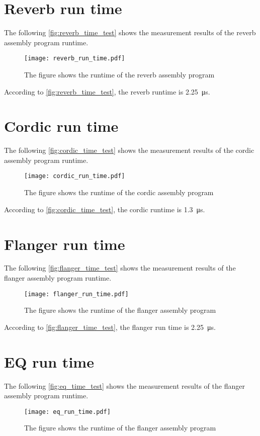 \section*{Reverb run time}
The following \autoref{fig:reverb_time_test} shows the measurement results of the \gls{reverb} assembly program runtime.
\begin{figure}[htbp!]
	\centering
		\texttt{[image: reverb\_run\_time.pdf]}
		\caption{The figure shows the runtime of the \gls{reverb} assembly program}
		\label{fig:reverb_time_test}
\end{figure}

According to \autoref{fig:reverb_time_test}, the \gls{reverb} runtime is \SI{2.25}{\micro\second}.

\section*{Cordic run time}
The following \autoref{fig:cordic_time_test} shows the measurement results of the cordic assembly program runtime.
\begin{figure}[htbp!]
	\centering
		\texttt{[image: cordic\_run\_time.pdf]}
		\caption{The figure shows the runtime of the cordic assembly program}
		\label{fig:cordic_time_test}
\end{figure}

According to \autoref{fig:cordic_time_test}, the cordic runtime is \SI{1.3}{\micro\second}.

\section*{Flanger run time}
The following \autoref{fig:flanger_time_test} shows the measurement results of the flanger assembly program runtime.
\begin{figure}[htbp!]
	\centering
		\texttt{[image: flanger\_run\_time.pdf]}
		\caption{The figure shows the runtime of the flanger assembly program}
		\label{fig:flanger_time_test}
\end{figure}

According to \autoref{fig:flanger_time_test}, the flanger run time is \SI{2.25}{\micro\second}.

\section*{EQ run time}
The following \autoref{fig:eq_time_test} shows the measurement results of the flanger assembly program runtime.
\begin{figure}[htbp!]
	\centering
		\texttt{[image: eq\_run\_time.pdf]}
		\caption{The figure shows the runtime of the flanger assembly program}
		\label{fig:eq_time_test}
\end{figure}

